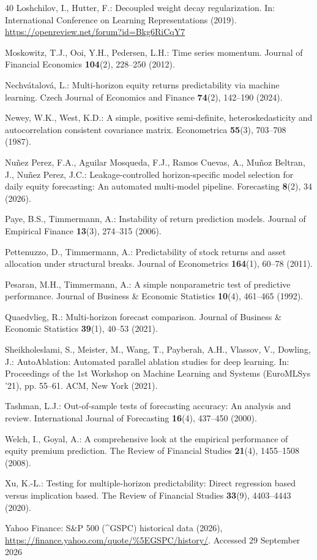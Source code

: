 \documentclass[runningheads,orivec]{llncs}
\begin{document}
\begin{thebibliography}{40}
Loshchilov, I., Hutter, F.: Decoupled weight decay regularization. In: International Conference on Learning Representations (2019). \url{https://openreview.net/forum?id=Bkg6RiCqY7}

Moskowitz, T.J., Ooi, Y.H., Pedersen, L.H.: Time series momentum. Journal of Financial Economics \textbf{104}(2), 228--250 (2012).

Nechv{\'a}talov{\'a}, L.: Multi-horizon equity returns predictability via machine learning. Czech Journal of Economics and Finance \textbf{74}(2), 142--190 (2024).

Newey, W.K., West, K.D.: A simple, positive semi-definite, heteroskedasticity and autocorrelation consistent covariance matrix. Econometrica \textbf{55}(3), 703--708 (1987).

Nu{\~n}ez Perez, F.A., Aguilar Mosqueda, F.J., Ramos Cuevas, A., Mu{\~n}oz Beltran, J., Nu{\~n}ez Perez, J.C.: Leakage-controlled horizon-specific model selection for daily equity forecasting: An automated multi-model pipeline. Forecasting \textbf{8}(2), 34 (2026).

Paye, B.S., Timmermann, A.: Instability of return prediction models. Journal of Empirical Finance \textbf{13}(3), 274--315 (2006).

Pettenuzzo, D., Timmermann, A.: Predictability of stock returns and asset allocation under structural breaks. Journal of Econometrics \textbf{164}(1), 60--78 (2011).

Pesaran, M.H., Timmermann, A.: A simple nonparametric test of predictive performance. Journal of Business \& Economic Statistics \textbf{10}(4), 461--465 (1992).

Quaedvlieg, R.: Multi-horizon forecast comparison. Journal of Business \& Economic Statistics \textbf{39}(1), 40--53 (2021).

Sheikholeslami, S., Meister, M., Wang, T., Payberah, A.H., Vlassov, V., Dowling, J.: AutoAblation: Automated parallel ablation studies for deep learning. In: Proceedings of the 1st Workshop on Machine Learning and Systems (EuroMLSys '21), pp. 55--61. ACM, New York (2021).

Tashman, L.J.: Out-of-sample tests of forecasting accuracy: An analysis and review. International Journal of Forecasting \textbf{16}(4), 437--450 (2000).

Welch, I., Goyal, A.: A comprehensive look at the empirical performance of equity premium prediction. The Review of Financial Studies \textbf{21}(4), 1455--1508 (2008).

Xu, K.-L.: Testing for multiple-horizon predictability: Direct regression based versus implication based. The Review of Financial Studies \textbf{33}(9), 4403--4443 (2020).

Yahoo Finance: S\&P 500 (\textasciicircum GSPC) historical data (2026), \url{https://finance.yahoo.com/quote/%5EGSPC/history/}. Accessed 29 September 2026
\end{thebibliography}
\end{document}
